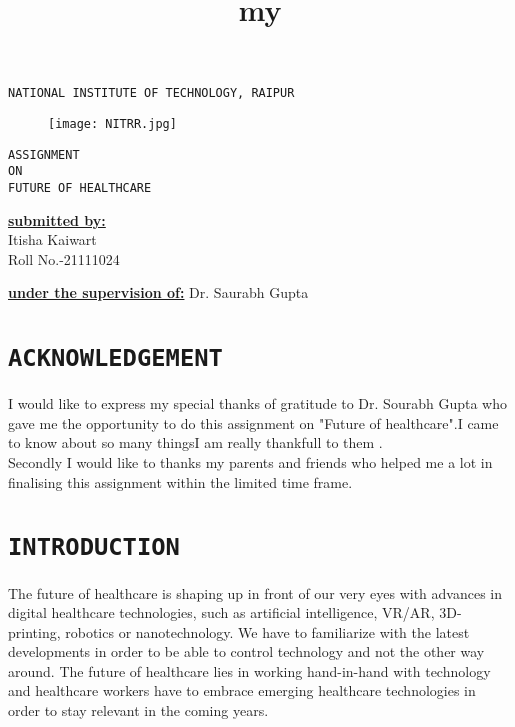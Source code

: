 \documentclass[12pt]{article}
\title{my}
\begin{document}
\centering\huge\texttt{NATIONAL INSTITUTE OF TECHNOLOGY, RAIPUR}\\

\begin{figure}[h]
\centering
\texttt{[image: NITRR.jpg]}
\end{figure}

\begin{center}


\huge\texttt{ASSIGNMENT \\ON\\ FUTURE OF HEALTHCARE}

\end{center}

\begin{minipage}[t]{5cm}


\flushleft\Large\textbf{\underline{submitted by:}}\\
Itisha Kaiwart\\
Roll No.-21111024
\end{minipage}
\hfill
\begin{minipage}[t]{5cm}


\Large\textbf{\underline{under the supervision of:}}
Dr. Saurabh Gupta
\end{minipage}
\pagebreak
\tableofcontents
\pagebreak

\section{\centering\LARGE\texttt{ACKNOWLEDGEMENT}}

\large \flushleft I would like to express my special thanks of gratitude to Dr. Sourabh Gupta who gave me the opportunity to do this assignment on "Future of  healthcare".I came to know about so many thingsI am really thankfull to them .\\



\vspace{1cm}
Secondly I would like to thanks my parents and friends who helped me a lot in finalising this assignment within the limited time frame.

\pagebreak


\section{\centering\LARGE\texttt{INTRODUCTION}}

\vspace{0.5cm}
\large\flushleft The future of healthcare is shaping up in front of our very eyes with advances in digital healthcare technologies, such as artificial intelligence, VR/AR, 3D-printing, robotics or nanotechnology. We have to familiarize with the latest developments in order to be able to control technology and not the other way around. The future of healthcare lies in working hand-in-hand with technology and healthcare workers have to embrace emerging healthcare technologies in order to stay relevant in the coming years. \\
\end{document}
